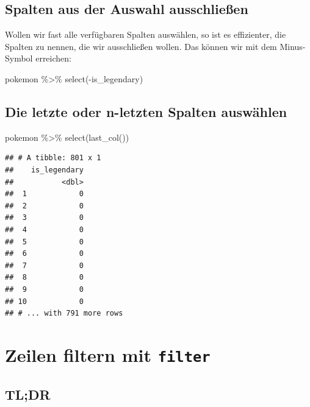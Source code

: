 \documentclass[
]{book}
\newenvironment{Shaded}{\begin{snugshade}}{\end{snugshade}}
\newcommand{\FunctionTok}[1]{\textcolor[rgb]{0.00,0.00,0.00}{#1}}
\newcommand{\NormalTok}[1]{#1}
\newcommand{\SpecialCharTok}[1]{\textcolor[rgb]{0.00,0.00,0.00}{#1}}
\begin{document}
\hypertarget{spalten-aus-der-auswahl-ausschlieuxdfen}{%
\section{Spalten aus der Auswahl ausschließen}\label{spalten-aus-der-auswahl-ausschlieuxdfen}}

Wollen wir fast alle verfügbaren Spalten auswählen, so ist es effizienter, die Spalten zu nennen, die wir ausschließen wollen. Das können wir mit dem Minus-Symbol erreichen:

\begin{Shaded}
\begin{Highlighting}[]
\NormalTok{pokemon }\SpecialCharTok{\%\textgreater{}\%}
  \FunctionTok{select}\NormalTok{(}\SpecialCharTok{{-}}\NormalTok{is\_legendary)}
\end{Highlighting}
\end{Shaded}

\hypertarget{die-letzte-oder-n-letzten-spalten-auswuxe4hlen}{%
\section{Die letzte oder n-letzten Spalten auswählen}\label{die-letzte-oder-n-letzten-spalten-auswuxe4hlen}}

\begin{Shaded}
\begin{Highlighting}[]
\NormalTok{pokemon }\SpecialCharTok{\%\textgreater{}\%}
  \FunctionTok{select}\NormalTok{(}\FunctionTok{last\_col}\NormalTok{())}
\end{Highlighting}
\end{Shaded}

\begin{verbatim}
## # A tibble: 801 x 1
##    is_legendary
##           <dbl>
##  1            0
##  2            0
##  3            0
##  4            0
##  5            0
##  6            0
##  7            0
##  8            0
##  9            0
## 10            0
## # ... with 791 more rows
\end{verbatim}

\hypertarget{zeilen-filtern-mit-filter}{%
\chapter{\texorpdfstring{Zeilen filtern mit \texttt{filter}}{Zeilen filtern mit filter}}\label{zeilen-filtern-mit-filter}}

\hypertarget{tldr-4}{%
\section*{TL;DR}\label{tldr-4}}
\end{document}
